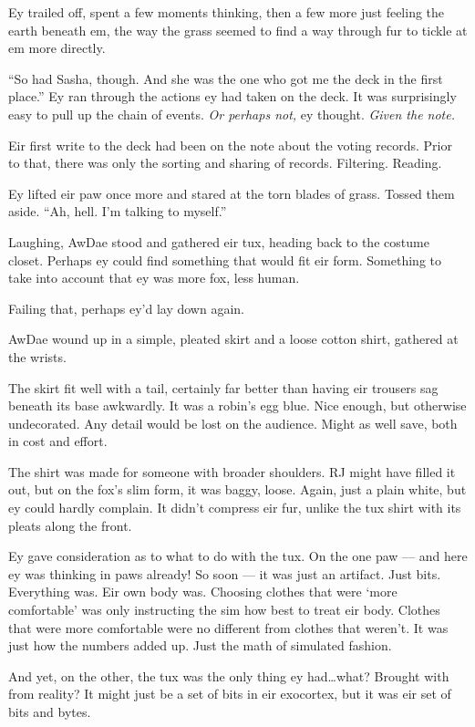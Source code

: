 Ey trailed off, spent a few moments thinking, then a few more just feeling the earth beneath em, the way the grass seemed to find a way through fur to tickle at em more directly.

``So had Sasha, though. And she was the one who got me the deck in the first place.'' Ey ran through the actions ey had taken on the deck. It was surprisingly easy to pull up the chain of events. \emph{Or perhaps not,} ey thought. \emph{Given the note.}

Eir first write to the deck had been on the note about the voting records. Prior to that, there was only the sorting and sharing of records. Filtering. Reading.

Ey lifted eir paw once more and stared at the torn blades of grass. Tossed them aside. ``Ah, hell. I'm talking to myself.''

Laughing, AwDae stood and gathered eir tux, heading back to the costume closet. Perhaps ey could find something that would fit eir form. Something to take into account that ey was more fox, less human.

Failing that, perhaps ey'd lay down again.

AwDae wound up in a simple, pleated skirt and a loose cotton shirt, gathered at the wrists.

The skirt fit well with a tail, certainly far better than having eir trousers sag beneath its base awkwardly. It was a robin's egg blue. Nice enough, but otherwise undecorated. Any detail would be lost on the audience. Might as well save, both in cost and effort.

The shirt was made for someone with broader shoulders. RJ might have filled it out, but on the fox's slim form, it was baggy, loose. Again, just a plain white, but ey could hardly complain. It didn't compress eir fur, unlike the tux shirt with its pleats along the front.

Ey gave consideration as to what to do with the tux. On the one paw — and here ey was thinking in paws already! So soon — it was just an artifact. Just bits. Everything was. Eir own body was. Choosing clothes that were `more comfortable' was only instructing the sim how best to treat eir body. Clothes that were more comfortable were no different from clothes that weren't. It was just how the numbers added up. Just the math of simulated fashion.

And yet, on the other, the tux was the only thing ey had\ldots{}what? Brought with from reality? It might just be a set of bits in eir exocortex, but it was eir set of bits and bytes.

